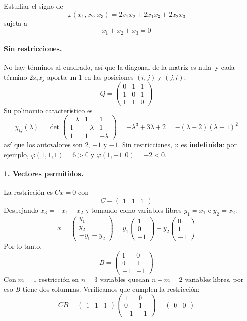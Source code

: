 \documentclass{article}
\begin{document}
Estudiar el signo de
\[
\varphi(x_1,x_2,x_3)=2x_1x_2+2x_1x_3+2x_2x_3
\]
sujeta a
\[
x_1+x_2+x_3=0
\]

\paragraph*{Sin restricciones.}
No hay términos al cuadrado, así que la diagonal de la matriz es nula, y cada término \(2x_ix_j\) aporta un \(1\) en las posiciones \((i,j)\) y \((j,i)\):
\[
Q=
\begin{pmatrix}
0 & 1 & 1\\
1 & 0 & 1\\
1 & 1 & 0
\end{pmatrix}
\]
Su polinomio característico es
\[
\chi_Q(\lambda)=\det\begin{pmatrix}
-\lambda & 1 & 1\\
1 & -\lambda & 1\\
1 & 1 & -\lambda
\end{pmatrix}
=-\lambda^3+3\lambda+2
=-(\lambda-2)(\lambda+1)^2
\]
así que los autovalores son \(2\), \(-1\) y \(-1\). Sin restricciones, \(\varphi\) es \textbf{indefinida}: por ejemplo, \(\varphi(1,1,1)=6>0\) y \(\varphi(1,-1,0)=-2<0\).

\paragraph*{1. Vectores permitidos.}
La restricción es \(Cx=0\) con
\[
C=\begin{pmatrix}1 & 1 & 1\end{pmatrix}
\]
Despejando \(x_3=-x_1-x_2\) y tomando como variables libres \(y_1=x_1\) e \(y_2=x_2\):
\[
x=
\begin{pmatrix}
y_1\\
y_2\\
-y_1-y_2
\end{pmatrix}
=
y_1
\begin{pmatrix}
1\\
0\\
-1
\end{pmatrix}
+
y_2
\begin{pmatrix}
0\\
1\\
-1
\end{pmatrix}
\]
Por lo tanto,
\[
B=
\begin{pmatrix}
1 & 0\\
0 & 1\\
-1 & -1
\end{pmatrix}
\]
Con \(m=1\) restricción en \(n=3\) variables quedan \(n-m=2\) variables libres, por eso \(B\) tiene dos columnas. Verificamos que cumplen la restricción:
\[
CB=
\begin{pmatrix}1 & 1 & 1\end{pmatrix}
\begin{pmatrix}
1 & 0\\
0 & 1\\
-1 & -1
\end{pmatrix}
=
\begin{pmatrix}0 & 0\end{pmatrix}
\]
\end{document}
